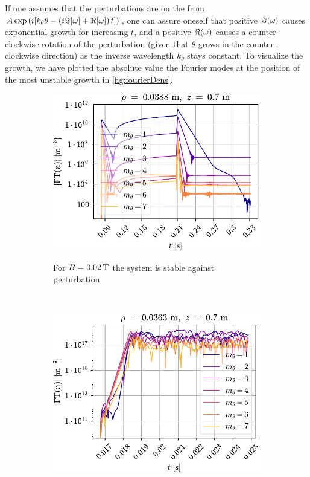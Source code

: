 \newpage
%
If one assumes that the perturbations are on the from $A\exp\left(i[k_\theta \theta - \left(i\Im[\omega] + \Re[\omega]\right) t]\right)$, one can assure oneself that positive $\Im(\omega)$ causes exponential growth for increasing $t$, and a positive $\Re(\omega)$ causes a counter-clockwise rotation of the perturbation (given that $\theta$ grows in the counter-clockwise direction) as the inverse wavelength $k_\theta$ stays constant.
To visualize the growth, we have plotted the absolute value the Fourier modes at the position of the most unstable growth in \cref{fig:fourierDens}.
%
\begin{figure}[h!]
    \centering
    \begin{subfigure}[h]{1\textwidth}
        \centering
        \includegraphics{fig/results/fourierModes/stable}
        \label{fig:fourierStable}
        \caption{For $B=0.02\, \text{T}$ the system is stable against perturbation}
    \end{subfigure}%
    \\
    \vspace*{0.5cm}
    \begin{subfigure}[h]{1\textwidth}
        \centering
        \includegraphics{fig/results/fourierModes/unstable}

\end{subfigure}
\end{figure}
